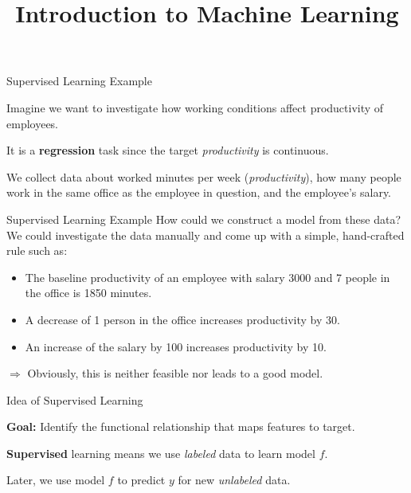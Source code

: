\documentclass[11pt,compress,t,notes=noshow, xcolor=table]{beamer}
\title{Introduction to Machine Learning}
\begin{document}


\begin{framei}{Supervised Learning Example}
\item Imagine we want to investigate how working conditions affect productivity of employees.
\item It is a \textbf{regression} task since the target \emph{productivity} is continuous.
\item We collect data about worked minutes per week (\emph{productivity}), how many people work in the same office as the employee in question, and the employee's salary.
\vfill
{} %
\end{framei}


\begin{frame2}{Supervised Learning Example}
How could we construct a model from these data?\\
\spacer
We could investigate the data manually and come up with a simple, hand-crafted rule such as:
\spacer
\begin{itemize}
\item The baseline productivity of an employee with salary 3000 and 7 people in the office is 1850 minutes.
\item A decrease of 1 person in the office increases productivity by 30.
\item An increase of the salary by 100 increases productivity by 10.
\end{itemize}
\vfill
$\Rightarrow$ Obviously, this is neither feasible nor leads to a good model.
\end{frame2}


\begin{framei}[sep=L]{Idea of Supervised Learning}
\item \textbf{Goal:} Identify the functional relationship that maps features to target.
\item \textbf{Supervised} learning means we use \emph{labeled} data to learn model $f$.
\item Later, we use model $f$ to predict $y$ for new \emph{unlabeled} data.
\end{framei}
\end{document}
